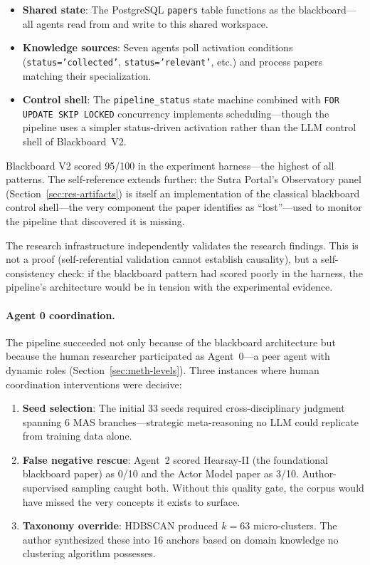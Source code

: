 \documentclass{article}
\begin{document}
\begin{itemize}[nosep]
  \item \textbf{Shared state}: The PostgreSQL \texttt{papers} table functions as the
    blackboard---all agents read from and write to this shared workspace.
  \item \textbf{Knowledge sources}: Seven agents poll activation conditions
    (\texttt{status='collected'}, \texttt{status='relevant'}, etc.) and process
    papers matching their specialization.
  \item \textbf{Control shell}: The \texttt{pipeline\_status} state machine combined
    with \texttt{FOR UPDATE SKIP LOCKED} concurrency implements scheduling---though
    the pipeline uses a simpler status-driven activation rather than the LLM control
    shell of Blackboard~V2.
\end{itemize}

\noindent
Blackboard V2 scored 95/100 in the experiment harness---the highest of all patterns.
The self-reference extends further: the Sutra Portal's Observatory panel
(Section~\ref{sec:res-artifacts}) is itself an implementation of the classical
blackboard control shell---the very component the paper identifies as ``lost''---used
to monitor the pipeline that discovered it is missing.

The research infrastructure independently validates the research findings. This is not
a proof (self-referential validation cannot establish causality), but a self-consistency
check: if the blackboard pattern had scored poorly in the harness, the pipeline's
architecture would be in tension with the experimental evidence.

\paragraph{Agent 0 coordination.}
The pipeline succeeded not only because of the blackboard architecture but because the
human researcher participated as Agent~0---a peer agent with dynamic roles
(Section~\ref{sec:meth-levels}). Three instances where human coordination interventions
were decisive:
\begin{enumerate}[nosep]
  \item \textbf{Seed selection}: The initial 33 seeds required cross-disciplinary
    judgment spanning 6 MAS branches---strategic meta-reasoning no LLM could replicate
    from training data alone.
  \item \textbf{False negative rescue}: Agent~2 scored Hearsay-II (the foundational
    blackboard paper) as 0/10 and the Actor Model paper as 3/10. Author-supervised
    sampling caught both. Without this quality gate, the corpus would have missed
    the very concepts it exists to surface.
  \item \textbf{Taxonomy override}: HDBSCAN produced $k{=}63$ micro-clusters. The
    author synthesized these into 16 anchors based on domain knowledge no clustering
    algorithm possesses.
\end{enumerate}
\end{document}
